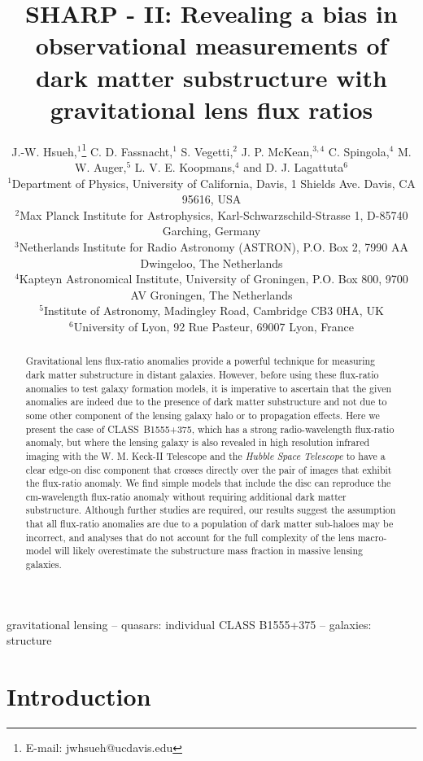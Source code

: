 \documentclass[a4paper,fleqn,usenatbib,useAMS]{mnras}
\title[Beware the effect of edge-on discs]{SHARP - II: Revealing a bias in observational measurements of dark matter substructure with gravitational lens flux ratios}
\author[Hsueh et al.]{J.-W. Hsueh,$^{1}$\thanks{E-mail: jwhsueh@ucdavis.edu} C. D. Fassnacht,$^{1}$ S. Vegetti,$^{2}$  J. P. McKean,$^{3,4}$ C. Spingola,$^{4}$ M. W. Auger,$^{5}$
\newauthor  L. V. E. Koopmans,$^{4}$ and D. J. Lagattuta$^{6}$\\
$^{1}$Department of Physics, University of California, Davis, 1 Shields Ave. Davis, CA 95616, USA\\
$^{2}$Max Planck Institute for Astrophysics, Karl-Schwarzschild-Strasse 1, D-85740 Garching, Germany\\
$^{3}$Netherlands Institute for Radio Astronomy (ASTRON), P.O. Box 2, 7990 AA Dwingeloo, The Netherlands\\
$^{4}$Kapteyn Astronomical Institute, University of Groningen, P.O. Box 800, 9700 AV Groningen, The Netherlands\\
$^{5}$Institute of Astronomy, Madingley Road, Cambridge CB3 0HA, UK\\
$^{6}$University of Lyon, 92 Rue Pasteur, 69007 Lyon, France}
\begin{document}

\pagerange{\pageref{firstpage}--\pageref{lastpage}} 

\maketitle

\label{firstpage}

\begin{abstract}
Gravitational lens flux-ratio anomalies provide a powerful technique for measuring dark matter substructure in distant galaxies. However, before using these flux-ratio anomalies to test galaxy formation models, it is imperative to ascertain that the given anomalies are indeed due to the presence of dark matter substructure and not due to some other component of the lensing galaxy halo or to propagation effects. Here we present the case of CLASS~B1555+375, which has a strong radio-wavelength flux-ratio anomaly, but where the lensing galaxy is also revealed in high resolution infrared imaging with the W. M. Keck-II Telescope and the {\it Hubble Space Telescope} to have a clear edge-on disc component that crosses directly over the pair of images that exhibit the flux-ratio anomaly. We find simple models that include the disc can reproduce the cm-wavelength flux-ratio anomaly without requiring additional dark matter substructure. Although further studies are required, our results suggest the assumption that all flux-ratio anomalies are due to a population of dark matter sub-haloes may be incorrect, and analyses that do not account for the full complexity of the lens macro-model will likely overestimate the substructure mass fraction in massive lensing galaxies.
\end{abstract}

\begin{keywords}
gravitational lensing -- quasars: individual CLASS B1555+375 -- galaxies: structure 
\end{keywords}

\section{Introduction}
\end{document}

